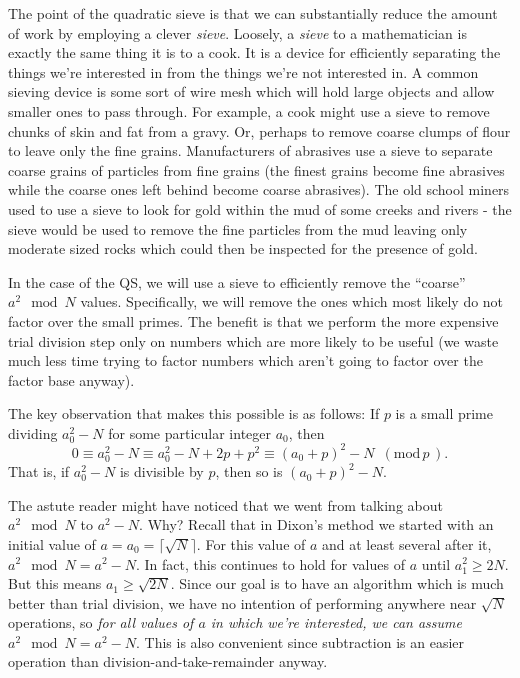 \documentclass[12pt]{article}
\newcommand{\md}[1]{\,\,\, ( \mathrm{mod}\, #1 \,) }
\begin{document}
  The point of the quadratic sieve is that we can substantially
  reduce the amount of work by employing a clever {\em sieve}.
  Loosely, a {\em sieve} to a mathematician is exactly the same thing
  it is to a cook. It is a device for efficiently separating the things
  we're interested in from the things we're not interested in.
  A common sieving device is some sort of wire mesh which will hold
  large objects and allow smaller ones to pass through.
  For example, a cook might use a sieve to remove chunks of skin and
  fat from a gravy. Or, perhaps to remove coarse clumps of flour to
  leave only the fine grains. Manufacturers of abrasives use a sieve
  to separate coarse grains of particles from fine grains
  (the finest grains become fine abrasives while the coarse ones left
  behind become coarse abrasives). The old school miners used to
  use a sieve to look for gold within the mud of some creeks and rivers
  - the sieve would be used to remove the fine particles from the mud
  leaving only moderate sized rocks which could then be inspected for
  the presence of gold.

  In the case of the QS, we will use a sieve to efficiently remove
  the ``coarse'' $a^2\mod N$ values. Specifically, we will remove
  the ones which most likely do not factor over the small primes.
  The benefit is that we perform the more expensive trial division
  step only on numbers which are more likely to be useful (we
  waste much less time trying to factor numbers which aren't going
  to factor over the factor base anyway).

  The key observation that makes this possible is as follows: If $p$
  is a small prime dividing $a_0^2 - N$ for some particular 
  integer $a_0$, then
  \[
    0 \equiv a_0^2 - N \equiv a_0^2 -N + 2p + p^2 \equiv (a_0 + p)^2 -N \md{p}.
  \]
  That is, if $a_0^2 - N$ is divisible by $p$, then so is $(a_0+p)^2 - N$.

  The astute reader might have noticed that we went from talking about
  $a^2\mod N$ to $a^2 - N$. Why? Recall that in Dixon's method we started
  with an initial value of $a=a_0=\lceil\sqrt{N}\rceil$. For this value
  of $a$ and at least several after it, $a^2\mod N = a^2-N$. In fact,
  this continues to hold for values of $a$ until $a_1^2 \ge 2N$. But this
  means $a_1 \ge \sqrt{2N}$. Since our goal is to have an algorithm which
  is much better than trial division, we have no intention of performing
  anywhere near $\sqrt{N}$ operations, so {\em for all values of $a$
  in which we're interested, we can assume $a^2\mod N = a^2 - N$}. This is
  also convenient since subtraction is an easier operation than 
  division-and-take-remainder anyway.
\end{document}
